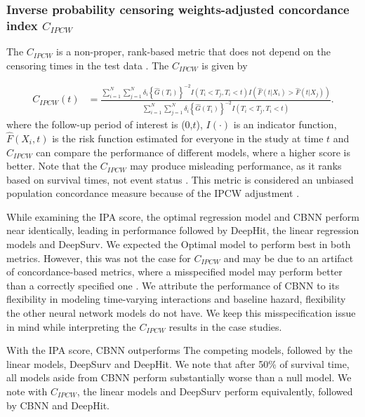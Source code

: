 
\hypertarget{inverse-probability-censoring-weights-adjusted-concordance-index}{%
\subsubsection{Inverse probability censoring weights-adjusted
concordance
index \(C_{IPCW}\)}\label{inverse-probability-censoring-weights-adjusted-concordance-index}}

The \(C_{IPCW}\) is a non-proper, rank-based metric that does not depend
on the censoring times in the test data \citep{uno2011}. The
\(C_{IPCW}\) is given by 

\begin{align} \label{eq:cidx}
C_{IPCW}(t) &= \frac{\sum^{N}_{i=1}\sum^{N}_{j=1}\delta_{i}\left\{\widehat{G}(T_{i})\right\}^{-2} I(T_{i}<T_{j},T_{i}<t) I\left(\widehat{F}(t|X_{i})>\widehat{F}(t|X_{j})\right)}{\sum^{N}_{i=1}\sum^{N}_{j=1}\delta_{i}\left\{\widehat{G}(T_{i})\right\}^{-2} I(T_{i}<T_{j},T_{i}<t)}.
\end{align} where the follow-up period of interest is (0,\(t\)),
\(I(\cdot)\) is an indicator function, \(\widehat{F}(X_{i},t)\) is the
risk function estimated for everyone in the study at time \(t\) and
\(C_{IPCW}\) can compare the performance of different models, where a
higher score is better. Note that the \(C_{IPCW}\) may produce
misleading performance, as it ranks based on survival times, not event
status \citep{cindexfails2019}. This metric is considered an unbiased
population concordance measure because of the IPCW adjustment
\citep{uno2011}.





 While examining the IPA score, the optimal
regression model and CBNN perform near identically, leading in performance followed by 
DeepHit, the linear regression models and DeepSurv. We expected the Optimal model to perform best in both
metrics. However, this was not the case for \(C_{IPCW}\) and may be due
to an artifact of concordance-based metrics, where a misspecified model
may perform better than a correctly specified one
\citep{cindexfails2019}. We attribute the performance of CBNN to its
flexibility in modeling time-varying interactions and baseline hazard,
flexibility the other neural network models do not have. We keep this misspecification issue
in mind while interpreting the \(C_{IPCW}\) results in the case studies.


With the IPA score, CBNN outperforms
The competing models, followed by the linear models, DeepSurv and DeepHit. We note that after
50\% of survival time, all models aside from CBNN perform substantially worse than a null model.
We note with \(C_{IPCW}\), the linear models and DeepSurv perform equivalently, followed by CBNN and
DeepHit.


